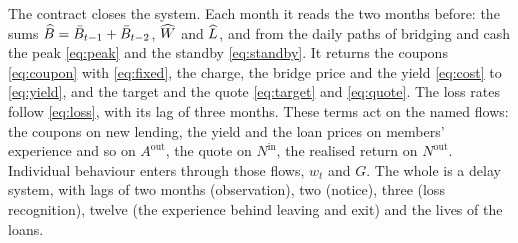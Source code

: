 The contract closes the system. Each month it reads the two months before: the sums $\widehat{B} = \bar B_{t-1}+\bar
B_{t-2}$, $\widehat{W}$ and $\widehat{L}$, and from the daily paths of bridging and cash the peak \eqref{eq:peak} and the
standby \eqref{eq:standby}. It returns the coupons \eqref{eq:coupon} with \eqref{eq:fixed}, the charge, the bridge
price and the yield \eqref{eq:cost} to \eqref{eq:yield}, and the target and the quote \eqref{eq:target} and
\eqref{eq:quote}. The loss rates follow \eqref{eq:loss}, with its lag of three months. These terms act on the named
flows: the coupons on new lending, the yield and the loan prices on members' experience and so on
$A^{\mathrm{out}}$, the quote on $N^{\mathrm{in}}$, the realised return on $N^{\mathrm{out}}$. Individual behaviour
enters through those flows, $w_{t}$ and $G$. The whole is a delay system, with lags of two months (observation),
two (notice), three (loss recognition), twelve (the experience behind leaving and exit) and the lives of the loans.

